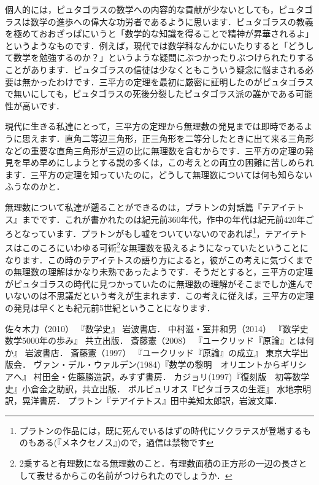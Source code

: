 \documentclass[./main]{subfiles}
\begin{document}
個人的には，ピュタゴラスの数学への内容的な貢献が少ないとしても，ピュタゴラスは数学の進歩への偉大な功労者であるように思います．ピュタゴラスの教義を極めておおざっぱにいうと「数学的な知識を得ることで精神が昇華されるよ」というようなものです．例えば，現代では数学科なんかにいたりすると「どうして数学を勉強するのか？」というような疑問にぶつかったりぶつけられたりすることがあります．ピュタゴラスの信徒は少なくともこういう疑念に悩まされる必要は無かったわけです．三平方の定理を最初に厳密に証明したのがピュタゴラスで無いにしても，ピュタゴラスの死後分裂したピュタゴラス派の誰かである可能性が高いです．


現代に生きる私達にとって，三平方の定理から無理数の発見までは即時であるように思えます．直角二等辺三角形，正三角形を二等分したときに出て来る三角形などの重要な直角三角形が三辺の比に無理数を含むからです．三平方の定理の発見を早め早めにしようとする説の多くは，この考えとの両立の困難に苦しめられます．三平方の定理を知っていたのに，どうして無理数については何も知らないふうなのかと．

無理数について私達が遡ることができるのは，プラトンの対話篇『テアイテトス』までです．これが書かれたのは紀元前360年代，作中の年代は紀元前420年ごろとなっています．プラトンがもし嘘をついていないのであれば\footnote{プラトンの作品には，既に死んでいるはずの時代にソクラテスが登場するものもある(『メネクセノス』)ので，過信は禁物です}，テアイテトスはこのころにいわゆる可術\footnote{ \cite{saito2} 2乗すると有理数になる無理数のこと．有理数面積の正方形の一辺の長さとして表せるからこの名前がつけられたのでしょうか．}な無理数を扱えるようになっていたということになります．この時のテアイテトスの語り方によると，彼がこの考えに気づくまでの無理数の理解はかなり未熟であったようです．そうだとすると，三平方の定理がピュタゴラスの時代に見つかっていたのに無理数の理解がそこまでしか進んでいないのは不思議だという考えが生まれます．この考えに従えば，三平方の定理の発見は早くとも紀元前5世紀ということになります．



\begin{thebibliography}{9}
 佐々木力（2010） 『数学史』 岩波書店．
 中村滋・室井和男（2014） 『数学史　数学5000年の歩み』 共立出版．
 斎藤憲（2008） 『ユークリッド『原論』とは何か』 岩波書店．
 斎藤憲（1997） 『ユークリッド『原論』の成立』 東京大学出版会．
 ヴァン・デル・ウァルデン(1984)『数学の黎明　オリエントからギリシアへ』 村田全・佐藤勝造訳，みすず書房．
 カジョリ(1997)『復刻版　初等数学史』小倉金之助訳，共立出版．
 ポルピュリオス『ピタゴラスの生涯』 水地宗明訳，晃洋書房．
 プラトン『テアイテトス』田中美知太郎訳，岩波文庫．
\end{thebibliography}
\end{document}
